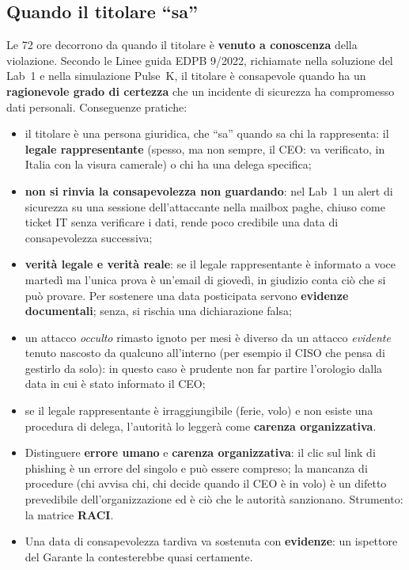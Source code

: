 \subsection{Quando il titolare ``sa''}
Le 72 ore decorrono da quando il titolare è \textbf{venuto a conoscenza} della violazione. Secondo le
Linee guida EDPB 9/2022, richiamate nella soluzione del Lab~1 e nella simulazione Pulse~K, il titolare è
consapevole quando ha un \textbf{ragionevole grado di certezza} che un incidente di sicurezza ha
compromesso dati personali. Conseguenze pratiche:
\begin{itemize}
  \item il titolare è una persona giuridica, che ``sa'' quando sa chi la rappresenta: il \textbf{legale
    rappresentante} (spesso, ma non sempre, il CEO: va verificato, in Italia con la visura camerale) o
    chi ha una delega specifica;
  \item \textbf{non si rinvia la consapevolezza non guardando}: nel Lab~1 un alert di sicurezza su una
    sessione dell'attaccante nella mailbox paghe, chiuso come ticket IT senza verificare i dati, rende
    poco credibile una data di consapevolezza successiva;
  \item \textbf{verità legale e verità reale}: se il legale rappresentante è informato a voce martedì ma
    l'unica prova è un'email di giovedì, in giudizio conta ciò che si può provare. Per sostenere una data
    posticipata servono \textbf{evidenze documentali}; senza, si rischia una dichiarazione falsa;
  \item un attacco \emph{occulto} rimasto ignoto per mesi è diverso da un attacco \emph{evidente} tenuto
    nascosto da qualcuno all'interno (per esempio il CISO che pensa di gestirlo da solo): in questo caso
    è prudente non far partire l'orologio dalla data in cui è stato informato il CEO;
  \item se il legale rappresentante è irraggiungibile (ferie, volo) e non esiste una procedura di
    delega, l'autorità lo leggerà come \textbf{carenza organizzativa}.
\end{itemize}

\begin{esame}
\begin{itemize}
  \item Distinguere \textbf{errore umano} e \textbf{carenza organizzativa}: il clic sul link di phishing è
    un errore del singolo e può essere compreso; la mancanza di procedure (chi avvisa chi, chi decide
    quando il CEO è in volo) è un difetto prevedibile dell'organizzazione ed è ciò che le autorità
    sanzionano. Strumento: la matrice \textbf{RACI}.
  \item Una data di consapevolezza tardiva va sostenuta con \textbf{evidenze}: un ispettore del Garante
    la contesterebbe quasi certamente.
\end{itemize}
\end{esame}

